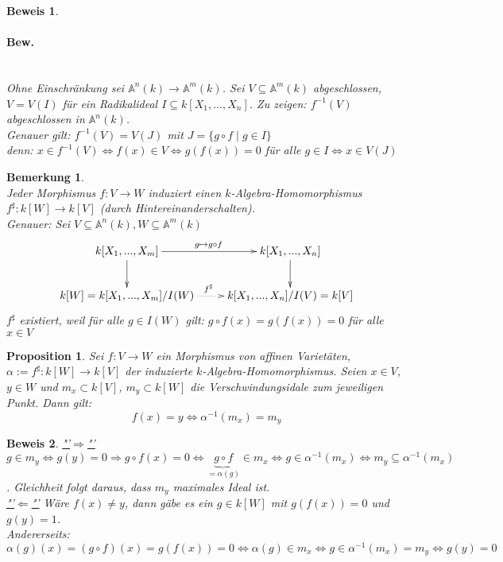 \documentclass[a4paper,12pt]{report}
\theoremstyle{break}
\newtheorem{Bem}[Def]{Bemerkung}
\newtheorem{Prop}[Def]{Proposition}
\theoremstyle{nonumberbreak}
\newtheorem{Bew}{Beweis}
\theoremstyle{nonumberplain}
\begin{document}
\begin{Bew}
\paragraph{Bew.}~\\
Ohne Einschränkung sei $\mathbb{A}^n(k)\rightarrow\mathbb{A}^m(k)$. Sei $V\subseteq \mathbb{A}^m(k)$ abgeschlossen, $V=V(I)$ für ein Radikalideal $I\subseteq k[X_1,...,X_n]$. Zu zeigen: $f^{-1}(V)$ abgeschlossen in $\mathbb{A}^n(k)$.\\
Genauer gilt: $f^{-1}(V)=V(J)$ mit $J=\{g\circ f \mid g\in I\}$\\
denn: $x\in f^{-1}(V) \Leftrightarrow f(x)\in V \Leftrightarrow g(f(x))=0$ für alle $g\in I\Leftrightarrow x\in V(J)$
\end{Bew}
\begin{Bem}~\\
Jeder Morphismus $f:V\rightarrow W$ induziert einen $k$-Algebra-Homomorphismus $f^{\sharp}: k[W]\rightarrow k[V]$ (durch Hintereinanderschalten).\\
Genauer: Sei $V\subseteq \mathbb{A}^n(k), W\subseteq \mathbb{A}^m(k)$
\[
\begin{xy}
\xymatrix{
k[X_1,...,X_m]\ar[d]\ar[r]^{g\mapsto g\circ f}&k[X_1,...,X_n]\ar[d]\\
k[W]=k[X_1,...,X_m]/I(W)\ar@{.>}[r]^{f^{\sharp}}&k[X_1,...,X_n]/I(V)=k[V]
}
\end{xy}
\]
$f^{\sharp}$ existiert, weil für alle $g\in I(W)$ gilt: $g\circ f(x) = g(f(x))=0$ für alle $x\in V$
\end{Bem}
\begin{Prop}
Sei $f: V\rightarrow W$ ein Morphismus von affinen Varietäten, $\alpha:= f^{\sharp}: k[W]\rightarrow k[V]$ der induzierte $k$-Algebra-Homomorphismus. Seien $x\in V$, $y\in W$ und $m_x\subset k[V]$, $m_y\subset k[W]$ die Verschwindungsidale zum jeweiligen Punkt. Dann gilt:
$$f(x)=y\Leftrightarrow \alpha^{-1}(m_x)= m_y$$
\end{Prop}
\begin{Bew}
\underline{"'$\Rightarrow$"'} $g\in m_y \Leftrightarrow g(y)=0\Rightarrow g\circ f(x)=0 \Leftrightarrow \underbrace{g\circ f}_{= \alpha(g)} \in m_x \Leftrightarrow g\in \alpha^{-1}(m_x) \Leftrightarrow m_y \subseteq \alpha^{-1}(m_x)$. Gleichheit folgt daraus, dass $m_y$ maximales Ideal ist.\\
\underline{"'$\Leftarrow$"'} Wäre $f(x)\neq y$, dann gäbe es  ein $g\in k[W]$ mit $g(f(x))=0$ und $g(y)=1$.\\
Andererseits:\\
$\alpha(g)(x)=(g\circ f)(x)=g(f(x))=0\Leftrightarrow \alpha(g)\in m_x \Leftrightarrow g\in \alpha^{-1}(m_x)=m_y \Leftrightarrow g(y)=0$
\end{Bew}
\end{document}
